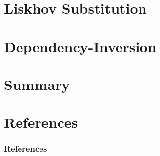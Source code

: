 \documentclass[9pt]{beamer}
\begin{document}
\section{Liskhov Substitution}

\section{Dependency-Inversion}

\section{Summary}

\section{References}
\scriptsize
\begin{frame}
  \frametitle{References}
   
  
\end{frame}
\end{document}
